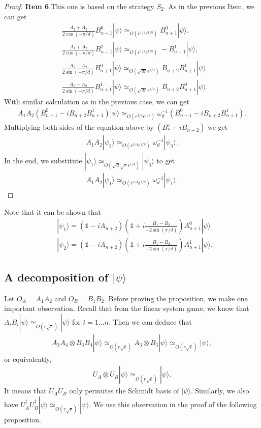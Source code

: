 \documentclass[11pt,letterpaper]{article}
\newcommand{\ket}[1]{|#1\rangle}
\newcommand{\x}{\otimes}
\newcommand{\ct}{^{\dagger}}
\newcommand{\1}{\mathbb{1}}
\newcommand{\ep}{\epsilon}
\newcommand{\se}{\sqrt{\epsilon}}
\newcommand{\qe}{\epsilon^{1/4}}
\newcommand{\sd}{\sqrt{d}}
\newcommand{\sr}{\sqrt{r}}
\newcommand{\appd}[1]{\simeq_{#1}}
\theoremstyle{definition}
\begin{document}
\begin{proof}
	\textbf{Item 6}.This one is based on the strategy $S_2$. As in the previous Item,
	we can get
	\begin{align}
		&\frac{A_1+A_2}{2 \cos(-\pi/d)} B_{n+1}^0 \ket{\psi} \appd{O(r^{1/4} \ep^{1/8})} B_{n+1}^0 \ket{\psi}.\\
		&\frac{A_1+A_2}{2 \cos(-\pi/d)} B_{n+1}^1 \ket{\psi}  \appd{O(r^{1/4} \ep^{1/8})} -B_{n+1}^1 \ket{\psi},\\
		&\frac{A_1-A_2}{2 \sin(-\pi/d)} B_{n+1}^0\ket{\psi} \appd{O(\sqrt{dr}\qe)}B_{n+2} B_{n+1}^1\ket{\psi}\\
		&\frac{A_1 -A_2}{2\sin(-\pi/d)} B_{n+1}^1 \ket{\psi} \appd{O(\sqrt{dr}\qe)} B_{n+2} B_{n+1}^0 \ket{\psi}.
	\end{align}
	With similar calculation as in the previous case, we can get 
	\begin{align}
		A_1A_2 (B_{n+1}^0 - i B_{n+2}B_{n+1}^1) \ket{\psi} \appd{O(r^{1/4} \ep^{1/8})} \omega_d^{-1} (B_{n+1}^0 - i B_{n+2}B_{n+1}^1).
	\end{align}
	Multiplying both sides of the equation above by $(B_\ast^\diamond+iB_{n+2})$ we get
	\begin{align}
		A_1A_2 \ket{\psi_3} \appd{O(r^{1/4} \ep^{1/8})} \omega_d^{-1}\ket{\psi_3}.
	\end{align}
	In the end, we substitute $\ket{\psi_1}  \appd{O(\sd \sr\qe)} \ket{\psi_3}$ to get
	\begin{align}
		A_1A_2 \ket{\psi_1} \appd{O(r^{1/4} \ep^{1/8})} \omega_d^{-1}\ket{\psi_1}.
	\end{align}
\end{proof}
Note that it can be shown that 
\begin{align}
	&\ket{\psi_1} =  (\1 - iA_{n+2})(\1 + i \frac{B_1 - B_2}{-2\sin(\pi/d)})A_{n+1}^0 \ket{\psi}\\
	&\ket{\psi_2} =  (\1 - iA_{n+2})(\1 + i \frac{B_1 - B_2}{-2\sin(\pi/d)})A_{n+1}^1 \ket{\psi}.
\end{align}

\subsection{A decomposition of $\ket{\psi}$}
Let $O_A = A_1A_2$ and $O_B = B_1B_2$.
Before proving the proposition, we make one important observation.
Recall that from the linear system game, we know that $A_iB_i \ket{\psi} \appd{O(r\se)} \ket{\psi}$ for $i = 1 \dots n$.
Then we can deduce that 
\begin{align}
	A_3A_4 \x B_3B_4 \ket{\psi} \appd{O(r\se)} A_3 \x B_3 \ket{\psi} \appd{O(r\se)} \ket{\psi},
\end{align}
or equivalently,
\begin{align}
	U_A \x U_B \ket{\psi} \appd{O(r\se)} \ket{\psi}.
\end{align}
It means that $U_A U_B $ only permutes the Schmidt basis of $\ket{\psi}$.
Similarly, we also have $U_A\ct U_B\ct \ket{\psi} \appd{O(r\se)} \ket{\psi}$.
We use this observation in the proof of the following proposition.
\end{document}
